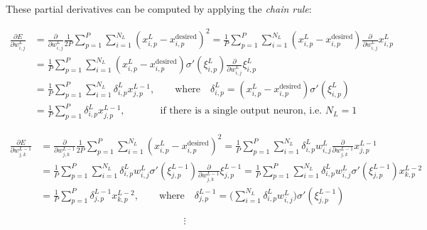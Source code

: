 These partial derivatives can be computed by applying the \textit{chain rule}:

\begin{equation}
\begin{split}
\frac{\partial E}{\partial w_{i, j}^L}
    & = \frac{\partial}{\partial w_{i, j}^L} \frac{1}{2P} \sum_{p=1}^P{ \sum_{i=1}^{N_L}{ ( x_{i, p}^L - x_{i, p}^\text{desired} )^2 } }
    = \frac{1}{P} \sum_{p=1}^P{ \sum_{i=1}^{N_L}{ ( x_{i, p}^L - x_{i, p}^\text{desired} ) } \frac{\partial}{\partial w_{i, j}^L} x_{i, p}^L } \\
    & = \frac{1}{P} \sum_{p=1}^P{ \sum_{i=1}^{N_L}{ ( x_{i, p}^L - x_{i, p}^\text{desired} ) \sigma'( \xi_{i, p}^L ) } \frac{\partial}{\partial w_{i, j}^L} \xi_{i, p}^L } \\
    & = \frac{1}{P} \sum_{p=1}^P{ \sum_{i=1}^{N_L}{ \delta_{i, p}^L } x_{j, p}^{L-1} }
    ,\qquad \text{where} \quad \delta_{i, p}^L = ( x_{i, p}^L - x_{i, p}^\text{desired} ) \sigma'( \xi_{i, p}^L ) \\
    & = \frac{1}{P} \sum_{p=1}^P{ \delta_{i, p}^L x_{j, p}^{L-1} }
    ,\qquad \quad \, \, \, \text{if there is a single output neuron, i.e. } N_L = 1
\end{split}
\end{equation}

\begin{equation}
\begin{split}
\frac{\partial E}{\partial w_{j, k}^{L-1}}
    & = \frac{\partial}{\partial w_{j, k}^{L-1}} \frac{1}{2P} \sum_{p=1}^P{ \sum_{i=1}^{N_L}{ ( x_{i, p}^L - x_{i, p}^\text{desired} )^2 } }
    = \frac{1}{P} \sum_{p=1}^P{ \sum_{i=1}^{N_L}{ \delta_{i, p}^L w_{i, j}^L } \frac{\partial}{\partial w_{j, k}^{L-1}} x_{j, p}^{L-1} } \\
    & = \frac{1}{P} \sum_{p=1}^P{ \sum_{i=1}^{N_L}{ \delta_{i, p}^L w_{i, j}^L } \sigma'( \xi_{j, p}^{L-1} ) \frac{\partial}{\partial w_{j, k}^{L-1}} \xi_{j, p}^{L-1} }
    = \frac{1}{P} \sum_{p=1}^P{ \sum_{i=1}^{N_L}{ \delta_{i, p}^L w_{i, j}^L } \sigma'( \xi_{j, p}^{L-1} ) } x_{k, p}^{L-2} \\
    & = \frac{1}{P} \sum_{p=1}^P{ \delta_{j, p}^{L-1} x_{k, p}^{L-2} }
    , \qquad \text{where} \quad \delta_{j, p}^{L-1} = \Big( \sum_{i=1}^{N_L}{ \delta_{i, p}^L w_{i, j}^L } \Big) \sigma'( \xi_{j, p}^{L-1} )
\end{split}
\end{equation}

\begin{equation*}
    \vdots
\end{equation*}

